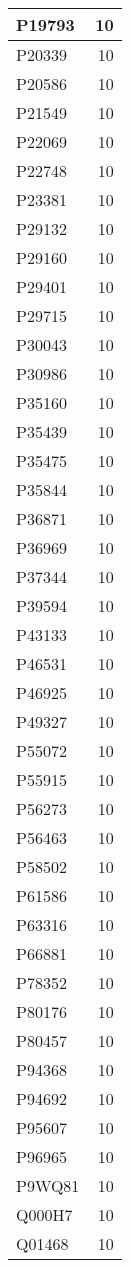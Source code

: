 \documentclass[
]{book}
\theoremstyle{definition}
\theoremstyle{definition}
\theoremstyle{definition}
\theoremstyle{definition}
\theoremstyle{remark}
\begin{document}
\begin{table}
\begin{tabular}{l|r}
\hline
P19793 & 10\\
\hline
P20339 & 10\\
\hline
P20586 & 10\\
\hline
P21549 & 10\\
\hline
P22069 & 10\\
\hline
P22748 & 10\\
\hline
P23381 & 10\\
\hline
P29132 & 10\\
\hline
P29160 & 10\\
\hline
P29401 & 10\\
\hline
P29715 & 10\\
\hline
P30043 & 10\\
\hline
P30986 & 10\\
\hline
P35160 & 10\\
\hline
P35439 & 10\\
\hline
P35475 & 10\\
\hline
P35844 & 10\\
\hline
P36871 & 10\\
\hline
P36969 & 10\\
\hline
P37344 & 10\\
\hline
P39594 & 10\\
\hline
P43133 & 10\\
\hline
P46531 & 10\\
\hline
P46925 & 10\\
\hline
P49327 & 10\\
\hline
P55072 & 10\\
\hline
P55915 & 10\\
\hline
P56273 & 10\\
\hline
P56463 & 10\\
\hline
P58502 & 10\\
\hline
P61586 & 10\\
\hline
P63316 & 10\\
\hline
P66881 & 10\\
\hline
P78352 & 10\\
\hline
P80176 & 10\\
\hline
P80457 & 10\\
\hline
P94368 & 10\\
\hline
P94692 & 10\\
\hline
P95607 & 10\\
\hline
P96965 & 10\\
\hline
P9WQ81 & 10\\
\hline
Q000H7 & 10\\
\hline
Q01468 & 10\\

\end{tabular}
\end{table}
\end{document}
